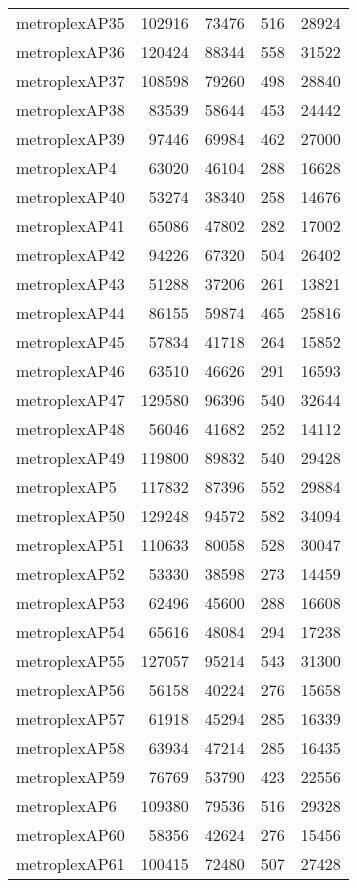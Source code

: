 \begin{tabular}{lrrrr}
metroplexAP35 & 102916 & 73476 & 516 & 28924 \\
metroplexAP36 & 120424 & 88344 & 558 & 31522 \\
metroplexAP37 & 108598 & 79260 & 498 & 28840 \\
metroplexAP38 & 83539 & 58644 & 453 & 24442 \\
metroplexAP39 & 97446 & 69984 & 462 & 27000 \\
metroplexAP4 & 63020 & 46104 & 288 & 16628 \\
metroplexAP40 & 53274 & 38340 & 258 & 14676 \\
metroplexAP41 & 65086 & 47802 & 282 & 17002 \\
metroplexAP42 & 94226 & 67320 & 504 & 26402 \\
metroplexAP43 & 51288 & 37206 & 261 & 13821 \\
metroplexAP44 & 86155 & 59874 & 465 & 25816 \\
metroplexAP45 & 57834 & 41718 & 264 & 15852 \\
metroplexAP46 & 63510 & 46626 & 291 & 16593 \\
metroplexAP47 & 129580 & 96396 & 540 & 32644 \\
metroplexAP48 & 56046 & 41682 & 252 & 14112 \\
metroplexAP49 & 119800 & 89832 & 540 & 29428 \\
metroplexAP5 & 117832 & 87396 & 552 & 29884 \\
metroplexAP50 & 129248 & 94572 & 582 & 34094 \\
metroplexAP51 & 110633 & 80058 & 528 & 30047 \\
metroplexAP52 & 53330 & 38598 & 273 & 14459 \\
metroplexAP53 & 62496 & 45600 & 288 & 16608 \\
metroplexAP54 & 65616 & 48084 & 294 & 17238 \\
metroplexAP55 & 127057 & 95214 & 543 & 31300 \\
metroplexAP56 & 56158 & 40224 & 276 & 15658 \\
metroplexAP57 & 61918 & 45294 & 285 & 16339 \\
metroplexAP58 & 63934 & 47214 & 285 & 16435 \\
metroplexAP59 & 76769 & 53790 & 423 & 22556 \\
metroplexAP6 & 109380 & 79536 & 516 & 29328 \\
metroplexAP60 & 58356 & 42624 & 276 & 15456 \\
metroplexAP61 & 100415 & 72480 & 507 & 27428 \\

\end{tabular}
